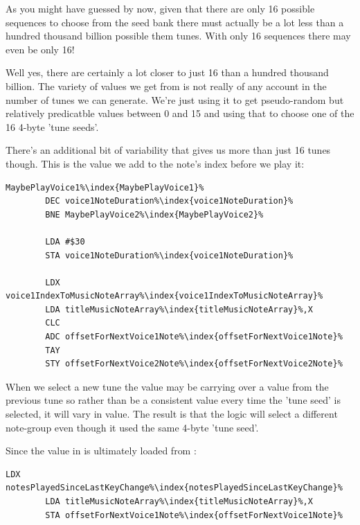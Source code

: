 As you might have guessed by now, given that there are only 16 possible sequences to choose from the seed bank there must
actually be a lot less than a hundred thousand billion possible them tunes. With only 16 sequences there may even be
only 16!

Well yes, there are certainly a lot closer to just 16 than a hundred thousand billion. The variety of values we get
from  is not really of any account in the number of tunes we can generate. We're just using it to get pseudo-random but
relatively predicatble values between 0 and 15 and using that to choose one of the 16 4-byte 'tune seeds'.

There's an additional bit of variability that gives us more than just 16 tunes though. This is the value we add to
the note's index before we play it:

\begin{lstlisting}[caption=\icode{offsetForNextVoice1Note\index{offsetForNextVoice1Note}} introduces additional tune permutations.,escapechar=\%]
MaybePlayVoice1%\index{MaybePlayVoice1}%   
        DEC voice1NoteDuration%\index{voice1NoteDuration}%
        BNE MaybePlayVoice2%\index{MaybePlayVoice2}%

        LDA #$30
        STA voice1NoteDuration%\index{voice1NoteDuration}%

        LDX voice1IndexToMusicNoteArray%\index{voice1IndexToMusicNoteArray}%
        LDA titleMusicNoteArray%\index{titleMusicNoteArray}%,X
        CLC
        ADC offsetForNextVoice1Note%\index{offsetForNextVoice1Note}%
        TAY
        STY offsetForNextVoice2Note%\index{offsetForNextVoice2Note}%
\end{lstlisting}

When we select a new tune the value  may be carrying over a value from the previous tune so
rather than be a consistent value every time the 'tune seed' is selected, it will vary in value. The result is that the
logic will select a different note-group even though it used the same 4-byte 'tune seed'.

Since the value in  is ultimately loaded from :

\begin{lstlisting}[escapechar=\%,caption=\icode{offsetForNextVoice1Note\index{offsetForNextVoice1Note}} is loaded from \icode{titleMusicNoteArray\index{titleMusicNoteArray}} and is propagated down
to \icode{offsetForNextVoice3Note\index{offsetForNextVoice3Note}}.]
        LDX notesPlayedSinceLastKeyChange%\index{notesPlayedSinceLastKeyChange}%
        LDA titleMusicNoteArray%\index{titleMusicNoteArray}%,X
        STA offsetForNextVoice1Note%\index{offsetForNextVoice1Note}%
\end{lstlisting}

